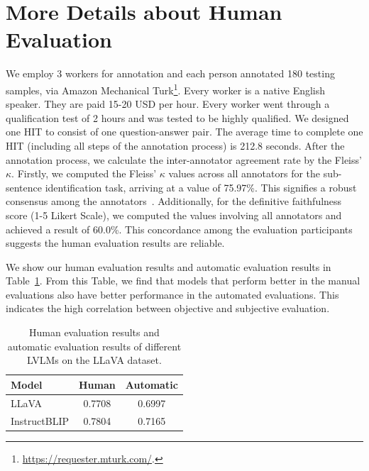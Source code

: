 \section{More Details about Human Evaluation}
\label{sec:human_eval}

We employ 3 workers for annotation and each person annotated 180 testing samples, via Amazon Mechanical Turk\footnote{\url{https://requester.mturk.com/}.}. Every worker is a native English speaker. 
They are paid 15-20 USD per hour. 
Every worker went through a qualification test of 2 hours and was tested to be highly qualified. We designed one HIT to consist of one question-answer pair.
The average time to complete one HIT (including all steps of the annotation process) is 212.8 seconds. 
After the annotation process, we calculate the inter-annotator agreement rate by the Fleiss’ $\kappa$. Firstly, we computed the Fleiss’ $\kappa$ values across all annotators for the sub-sentence identification task, arriving at a value of 75.97\%. This signifies a robust consensus among the annotators~\cite{moore2006statistics}. Additionally, for the definitive faithfulness score (1-5 Likert Scale), we computed the values involving all annotators and achieved a result of 60.0\%. This concordance among the evaluation participants suggests the human evaluation results are reliable.



We show our human evaluation results and automatic evaluation results in Table~\ref{tab:human_eval}. From this Table, we find that models that perform better in the manual evaluations also have better performance in the automated evaluations. This indicates the high correlation between objective and subjective evaluation.



\begin{table}[]
    \centering
    \begin{tabular}{lcc} \toprule
\bf         Model& \bf  Human & \bf Automatic \\ \midrule
         LLaVA & 0.7708&0.6997\\
         InstructBLIP &  0.7804&0.7165\\
         
         \bottomrule
    \end{tabular}
    \caption{Human evaluation results and automatic evaluation results of different LVLMs on the LLaVA dataset.}
    \label{tab:human_eval}
\end{table}

